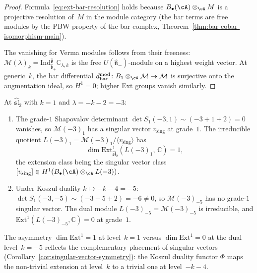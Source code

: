 \begin{proof}
Formula~\eqref{eq:ext-bar-resolution} holds because
$B_\bullet(\cA) \otimes_\cA M$ is a projective resolution of~$M$
in the module category (the bar terms are free modules by the
PBW property of the bar complex,
Theorem~\ref{thm:bar-cobar-isomorphism-main}).

The vanishing for Verma modules follows from their freeness:
$\mathcal{M}(\lambda)_k = \mathrm{Ind}_{\hat{\mathfrak{b}}_+}
^{\widehat{\mathfrak{g}}} \mathbb{C}_{\lambda,k}$
is the free $U(\hat{\mathfrak{n}}_-)$-module on a highest weight
vector.  At generic~$k$, the bar differential
$d^{\mathrm{mod}}_{\mathrm{bar}}\colon B_1 \otimes_\cA \mathcal{M}
\to \mathcal{M}$ is surjective onto the augmentation ideal,
so $H^1 = 0$; higher Ext groups vanish similarly.
\end{proof}

\begin{example}
\label{ex:ext1-special-level}
At $\widehat{\mathfrak{sl}}_2$ with $k = 1$ and $\lambda = -k-2 = -3$:
\begin{enumerate}[label=\textup{(\roman*)}]
\item The grade-$1$ Shapovalov determinant
  $\det S_1(-3, 1) \sim (-3 + 1 + 2) = 0$ vanishes, so
  $\mathcal{M}(-3)_1$ has a singular vector
  $v_{\mathrm{sing}}$ at grade~$1$.  The irreducible quotient
  $L(-3)_1 = \mathcal{M}(-3)_1 / \langle v_{\mathrm{sing}} \rangle$
  has
  \begin{equation}\label{eq:ext1-singular}
  \dim \mathrm{Ext}^1_{\widehat{\mathfrak{sl}}_2}(L(-3)_1,\,
  \mathbb{C}) = 1,
  \end{equation}
  the extension class being the singular vector class
  $[v_{\mathrm{sing}}] \in H^1(B_\bullet(\cA) \otimes_\cA L(-3))$.

\item Under Koszul duality $k \mapsto -k-4 = -5$:
  $\det S_1(-3, -5) \sim (-3 - 5 + 2) = -6 \neq 0$, so
  $\mathcal{M}(-3)_{-5}$ has no grade-$1$ singular vector.
  The dual module $L(-3)_{-5} = \mathcal{M}(-3)_{-5}$ is
  irreducible, and
  $\mathrm{Ext}^1(L(-3)_{-5}, \mathbb{C}) = 0$ at grade~$1$.
\end{enumerate}

The asymmetry $\dim \mathrm{Ext}^1 = 1$ at level~$k = 1$ versus
$\dim \mathrm{Ext}^1 = 0$ at the dual level~$k = -5$
reflects the complementary placement of singular vectors
(Corollary~\ref{cor:singular-vector-symmetry}):
the Koszul duality functor $\Phi$ maps the non-trivial extension
at level~$k$ to a trivial one at level~$-k-4$.
\end{example}

